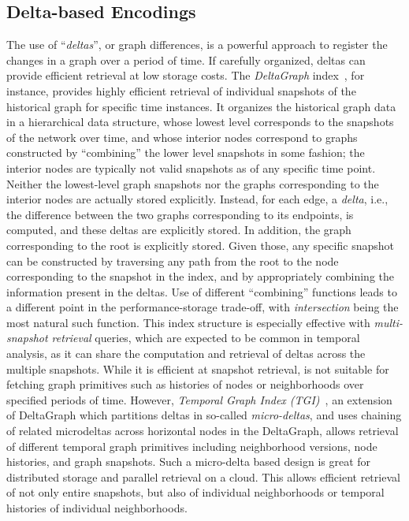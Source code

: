 \documentclass{svjour3}
\begin{document}
\subsection{Delta-based Encodings}
The use of ``{\em deltas}'', or graph differences, is a powerful approach to register the changes in a graph over a period of time. If carefully organized, deltas can provide efficient retrieval at low storage costs. 
The {\em DeltaGraph} index~\cite{khurana2013efficient}, for instance, provides highly efficient retrieval of individual snapshots of the historical graph for specific time instances. It organizes the historical graph data in a hierarchical data structure, whose lowest level corresponds
to the snapshots of the network over time, and whose interior nodes correspond to graphs constructed by ``combining''
the lower level snapshots in some fashion; the interior nodes are typically not valid snapshots as of any specific time point. Neither the lowest-level
graph snapshots nor the graphs corresponding to the interior nodes are actually stored explicitly. Instead, for each edge, a {\em delta}, i.e., the
difference between the two graphs corresponding to its endpoints, is computed, and these deltas are explicitly stored. In addition, the graph
corresponding to the root is explicitly stored. Given those, any specific snapshot can be constructed by traversing any
path from the root to the node corresponding to the snapshot in the index, and by appropriately combining the information present in the deltas.
Use of different ``combining'' functions leads to a different point in the performance-storage trade-off, with {\em intersection} being the most
natural such function.  This index structure is especially effective with {\em multi-snapshot retrieval} queries, which are expected to be common in temporal 
analysis, as it can share the computation and retrieval of deltas across the multiple snapshots. 
While it is efficient at snapshot retrieval, is not suitable for fetching graph primitives such as histories of nodes or neighborhoods over specified periods of time. However, {\em Temporal Graph Index (TGI)}~\cite{khurana2016storing}, an extension of DeltaGraph which partitions deltas in so-called {\em micro-deltas}, and uses chaining of related microdeltas across horizontal nodes in the DeltaGraph, allows retrieval of different temporal graph primitives including neighborhood versions, node histories, and graph snapshots. 
Such a micro-delta based design is great for distributed storage and parallel retrieval on a cloud. This allows efficient retrieval of not only
entire snapshots, but also of individual neighborhoods or temporal histories of individual neighborhoods.
\end{document}
